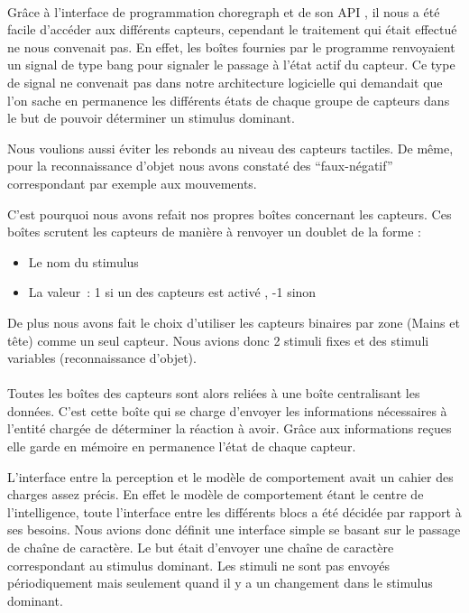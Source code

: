 
\paragraph{}
Grâce à l'interface de programmation choregraph et de son API , il nous a été
facile d'accéder aux différents capteurs, cependant le traitement qui était
effectué ne nous convenait pas. En effet, les boîtes fournies par le programme
renvoyaient un signal de type bang pour signaler le passage à l'état actif du
capteur. Ce type de signal ne convenait pas dans notre architecture logicielle
qui demandait que l'on sache en permanence les différents états de chaque
groupe de capteurs dans le but de pouvoir déterminer un stimulus dominant.

Nous voulions aussi éviter les rebonds au niveau des capteurs tactiles. 
De même, pour la reconnaissance d'objet nous avons constaté des ``faux-négatif''
correspondant par exemple aux mouvements. 
  
C'est pourquoi nous avons refait nos propres boîtes concernant les capteurs.
Ces boîtes scrutent les capteurs de manière à renvoyer un doublet de la forme :
\begin{itemize}
  \item Le nom du stimulus
  \item La valeur~: 1 si un des capteurs est activé , -1 sinon
\end{itemize}
 
De plus nous avons fait le choix d'utiliser les capteurs binaires par zone 
(Mains et tête) comme un seul capteur. Nous avions donc 2 stimuli fixes et
des stimuli variables (reconnaissance d'objet). 

\paragraph{}
Toutes les boîtes des capteurs sont alors reliées à une boîte centralisant les 
données. C'est cette boîte qui se charge d'envoyer les informations nécessaires 
à l'entité chargée de déterminer la réaction à avoir.
Grâce aux informations reçues elle garde en mémoire en permanence l'état de chaque capteur.

L'interface entre la perception et le modèle de comportement avait un cahier des charges assez précis. 
En effet le modèle de comportement étant le centre de l'intelligence, toute l'interface 
entre les différents blocs a été décidée par rapport à ses besoins. Nous avions donc définit
une interface simple se basant sur le passage de chaîne de caractère. Le but était 
d'envoyer une chaîne de caractère correspondant au stimulus dominant. Les stimuli ne 
sont pas envoyés périodiquement mais seulement quand il y a un changement dans le 
stimulus dominant.

